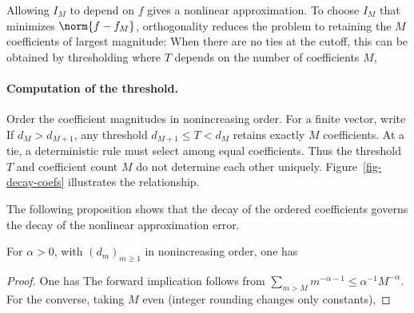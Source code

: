Allowing $I_M$ to depend on $f$ gives a nonlinear approximation. To choose $I_M$ that minimizes $\norm{f-f_M}$, orthogonality reduces the problem to retaining the $M$ coefficients of largest magnitude:
When there are no ties at the cutoff, this can be obtained by thresholding
where $T$ depends on the number of coefficients $M$, 

  
\paragraph{Computation of the threshold.}

Order the coefficient magnitudes in nonincreasing order. For a finite vector, write
If $d_M>d_{M+1}$, any threshold $d_{M+1}\leq T<d_M$ retains exactly $M$ coefficients. At a tie, a deterministic rule must select among equal coefficients. Thus the threshold $T$ and coefficient count $M$ do not determine each other uniquely. Figure~\ref{fig-decay-coefs} illustrates the relationship.

The following proposition shows that the decay of the ordered coefficients governs the decay of the nonlinear approximation error.

\begin{prop}\label{prop-equiv-comp-decay}
For $\alpha>0$, with $(d_m)_{m\geq1}$ in nonincreasing order, one has
\end{prop}

\begin{proof}
One has
The forward implication follows from $\sum_{m>M}m^{-\alpha-1}\leq\alpha^{-1}M^{-\alpha}$. For the converse, taking $M$ even (integer rounding changes only constants),
\end{proof}




